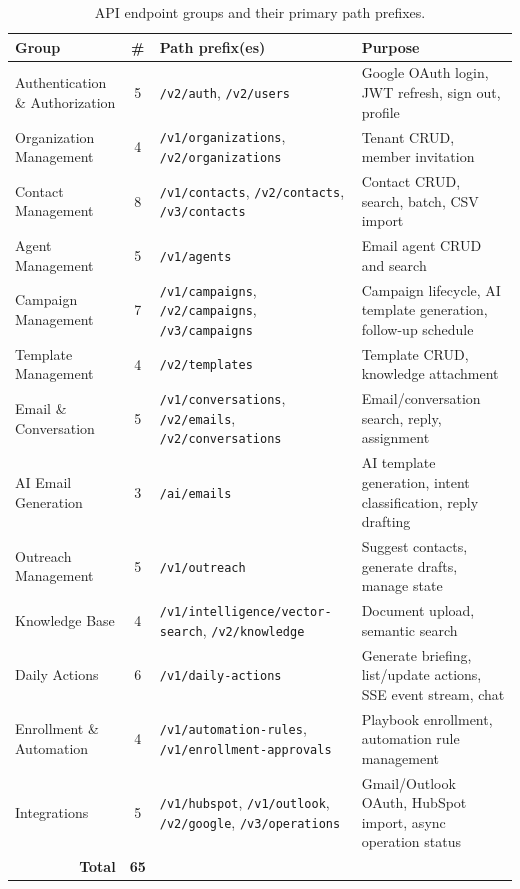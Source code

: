 \documentclass[a4paper]{article}
\begin{document}
\begin{table}[H]
\centering
\caption{API endpoint groups and their primary path prefixes.}
\label{tab:api-groups}
\small
\begin{tabular}{|p{3.8cm}|c|p{4.2cm}|p{4.2cm}|}
\hline
\textbf{Group} & \textbf{\#} & \textbf{Path prefix(es)} &
\textbf{Purpose} \\
\hline
Authentication \& Authorization & 5 & \texttt{/v2/auth},
\texttt{/v2/users} & Google OAuth login, JWT refresh, sign out,
profile \\
\hline
Organization Management & 4 & \texttt{/v1/organizations},
\texttt{/v2/organizations} & Tenant CRUD, member invitation \\
\hline
Contact Management & 8 & \texttt{/v1/contacts},
\texttt{/v2/contacts}, \texttt{/v3/contacts} & Contact CRUD,
search, batch, CSV import \\
\hline
Agent Management & 5 & \texttt{/v1/agents} & Email agent CRUD
and search \\
\hline
Campaign Management & 7 & \texttt{/v1/campaigns},
\texttt{/v2/campaigns}, \texttt{/v3/campaigns} & Campaign
lifecycle, AI template generation, follow-up schedule \\
\hline
Template Management & 4 & \texttt{/v2/templates} & Template CRUD,
knowledge attachment \\
\hline
Email \& Conversation & 5 & \texttt{/v1/conversations},
\texttt{/v2/emails}, \texttt{/v2/conversations} & Email/conversation
search, reply, assignment \\
\hline
AI Email Generation & 3 & \texttt{/ai/emails} & AI template
generation, intent classification, reply drafting \\
\hline
Outreach Management & 5 & \texttt{/v1/outreach} & Suggest
contacts, generate drafts, manage state \\
\hline
Knowledge Base & 4 & \texttt{/v1/intelligence/vector-search},
\texttt{/v2/knowledge} & Document upload, semantic search \\
\hline
Daily Actions & 6 & \texttt{/v1/daily-actions} & Generate
briefing, list/update actions, SSE event stream, chat \\
\hline
Enrollment \& Automation & 4 & \texttt{/v1/automation-rules},
\texttt{/v1/enrollment-approvals} & Playbook enrollment,
automation rule management \\
\hline
Integrations & 5 & \texttt{/v1/hubspot}, \texttt{/v1/outlook},
\texttt{/v2/google}, \texttt{/v3/operations} & Gmail/Outlook
OAuth, HubSpot import, async operation status \\
\hline
\multicolumn{1}{|r|}{\textbf{Total}} & \textbf{65} &
\multicolumn{2}{l|}{} \\
\hline
\end{tabular}
\end{table}
\end{document}
